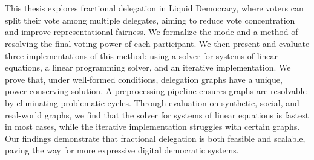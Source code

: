 \chapter{\abstractname}

This thesis explores fractional delegation in Liquid Democracy, where voters can split their vote among multiple delegates, aiming to reduce vote concentration and improve representational fairness. We formalize the mode and a method of resolving the final voting power of each participant. We then present and evaluate three implementations of this method: using a solver for systems of linear equations, a linear programming solver, and an iterative implementation. We prove that, under well-formed conditions, delegation graphs have a unique, power-conserving solution. A preprocessing pipeline ensures graphs are resolvable by eliminating problematic cycles. Through evaluation on synthetic, social, and real-world graphs, we find that the solver for systems of linear equations is fastest in most cases, while the iterative implementation struggles with certain graphs. Our findings demonstrate that fractional delegation is both feasible and scalable, paving the way for more expressive digital democratic systems.
